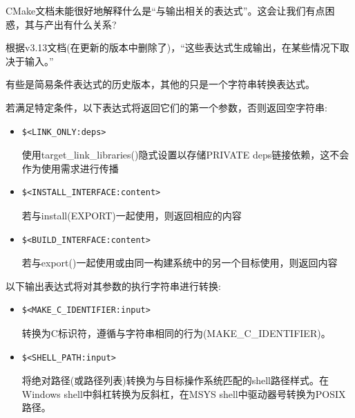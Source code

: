CMake文档未能很好地解释什么是“与输出相关的表达式”。这会让我们有点困惑，其与产出有什么关系?

根据v3.13文档(在更新的版本中删除了)，“这些表达式生成输出，在某些情况下取决于输入。” 

有些是简易条件表达式的历史版本，其他的只是一个字符串转换表达式。

若满足特定条件，以下表达式将返回它们的第一个参数，否则返回空字符串:

\begin{itemize}
\item 
\begin{lstlisting}[style=styleCMake]
$<LINK_ONLY:deps>
\end{lstlisting}

使用target\_link\_libraries()隐式设置以存储PRIVATE deps链接依赖，这不会作为使用需求进行传播

\item 
\begin{lstlisting}[style=styleCMake]
$<INSTALL_INTERFACE:content>
\end{lstlisting}

若与install(EXPORT)一起使用，则返回相应的内容

\item 
\begin{lstlisting}[style=styleCMake]
$<BUILD_INTERFACE:content> 
\end{lstlisting}

若与export()一起使用或由同一构建系统中的另一个目标使用，则返回内容
\end{itemize}

以下输出表达式将对其参数的执行字符串进行转换:

\begin{itemize}
\item 
\begin{lstlisting}[style=styleCMake]
$<MAKE_C_IDENTIFIER:input> 
\end{lstlisting}

转换为C标识符，遵循与字符串相同的行为(MAKE\_C\_IDENTIFIER)。

\item 
\begin{lstlisting}[style=styleCMake]
$<SHELL_PATH:input>
\end{lstlisting}

将绝对路径(或路径列表)转换为与目标操作系统匹配的shell路径样式。在Windows shell中斜杠转换为反斜杠，在MSYS shell中驱动器号转换为POSIX路径。
\end{itemize}

